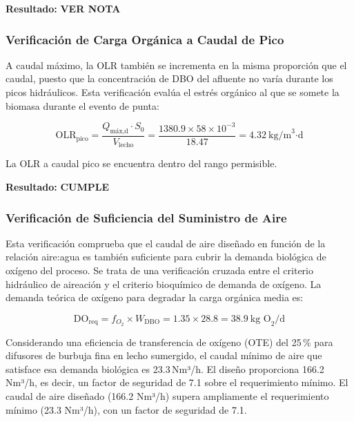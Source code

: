 \documentclass[12pt,a4paper]{article}
\begin{document}
\textbf{Resultado:} \textbf{VER NOTA}

\subsubsection*{Verificación de Carga Orgánica a Caudal de Pico}

A caudal máximo, la OLR también se incrementa en la misma proporción que el caudal, puesto que la concentración de DBO del afluente no varía durante los picos hidráulicos. Esta verificación evalúa el estrés orgánico al que se somete la biomasa durante el evento de punta:

\begin{equation}
\text{OLR}_{\text{pico}} = \frac{Q_{\text{máx,d}} \cdot S_0}{V_{\text{lecho}}} = \frac{1380.9 \times 58 \times 10^{-3}}{18.47} = 4.32\ \text{kg/m}^3\text{·d}
\end{equation}

La OLR a caudal pico se encuentra dentro del rango permisible.

\textbf{Resultado:} \textbf{CUMPLE}

\subsubsection*{Verificación de Suficiencia del Suministro de Aire}

Esta verificación comprueba que el caudal de aire diseñado en función de la relación aire:agua es también suficiente para cubrir la demanda biológica de oxígeno del proceso. Se trata de una verificación cruzada entre el criterio hidráulico de aireación y el criterio bioquímico de demanda de oxígeno. La demanda teórica de oxígeno para degradar la carga orgánica media es:

\begin{equation}
\text{DO}_{\text{req}} = f_{O_2} \times W_{\text{DBO}} = 1.35 \times 28.8 = 38.9\ \text{kg O}_2\text{/d}
\end{equation}

Considerando una eficiencia de transferencia de oxígeno (OTE) del 25\,\% para difusores de burbuja fina en lecho sumergido, el caudal mínimo de aire que satisface esa demanda biológica es 23.3\,Nm³/h. El diseño proporciona 166.2\,Nm³/h, es decir, un factor de seguridad de 7.1 sobre el requerimiento mínimo. El caudal de aire diseñado (166.2 Nm³/h) supera ampliamente el requerimiento mínimo (23.3 Nm³/h), con un factor de seguridad de 7.1.
\end{document}
